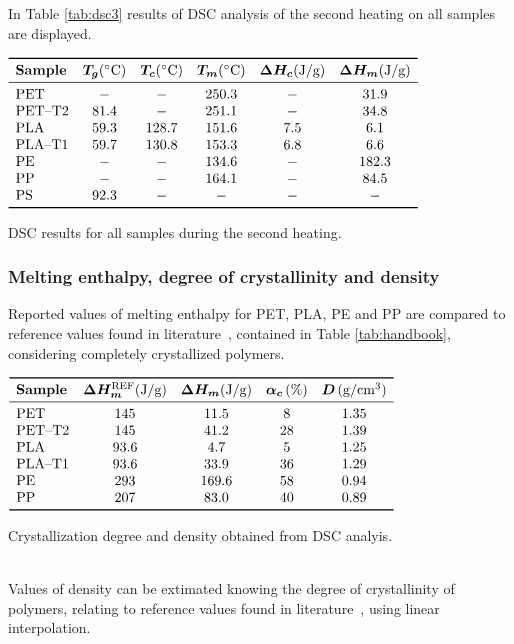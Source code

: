 \documentclass[a4paper, 11pt]{article}
\begin{document}
In Table \ref{tab:dsc3} results of DSC analysis of the second heating on all samples are displayed. 
\begin{table}[htp]
\centering
$
\begin{array}{lccccc}
\toprule
\textbf{Sample} & \bm{T_{g}} (\SI{}{\celsius}) & \bm{T_{c}} (\SI{}{\celsius}) & \bm{T_m} (\SI{}{\celsius}) & \bm{\Delta H_{c}} (\si{J/g}) & \bm{\Delta H_m} (\si{J/g}) \\
\midrule
\text{PET} & - & - & 250.3 & - & 31.9 \\
\text{PET–T2} & 81.4 & - & 251.1 & - & 34.8 \\
\text{PLA} & 59.3 & 128.7 & 151.6 & 7.5 & 6.1 \\
\text{PLA–T1} & 59.7 & 130.8 & 153.3 & 6.8 & 6.6 \\
\text{PE} & - & - & 134.6 & - & 182.3 \\
\text{PP} & - & - & 164.1 & - & 84.5 \\
\text{PS} & 92.3 & - & - & - & - \\
\bottomrule
\end{array}
$
\caption{DSC results for all samples during the second heating.}
\label{tab:dsc3}
\end{table}

\newpage

\subsubsection{Melting enthalpy, degree of crystallinity and density}

Reported values of melting enthalpy for PET, PLA, PE and PP are compared to reference values found in literature~\cite{handbook}, contained in Table \ref{tab:handbook}, considering completely crystallized polymers.
\begin{table}[htp]
\centering
$
\begin{array}{lcccc}
\toprule
\textbf{Sample} & \bm{\Delta H_m^\text{REF}} (\si{J/g})  & \bm{\Delta H_m} (\si{J/g})  & \bm{\alpha_c} \,(\%) & \bm{D}\, (\si{g/cm^3}) \\
\midrule
\text{PET} & 145 & 11.5 & 8 & 1.35 \\
\text{PET–T2} & 145 & 41.2 & 28 & 1.39 \\
\text{PLA} & 93.6 & 4.7 & 5 & 1.25\\
\text{PLA–T1} & 93.6 & 33.9 & 36 & 1.29\\
\text{PE} & 293 & 169.6 & 58 & 0.94\\
\text{PP} & 207 & 83.0 & 40 & 0.89 \\
\bottomrule
\end{array}
$
\caption{Crystallization degree and density obtained from DSC analyis.}
\label{tab:handbook}
\end{table}\\
Values of density can be extimated knowing the degree of crystallinity of polymers, relating to reference values found in literature~\cite{handbook}, using linear interpolation. 
\end{document}
